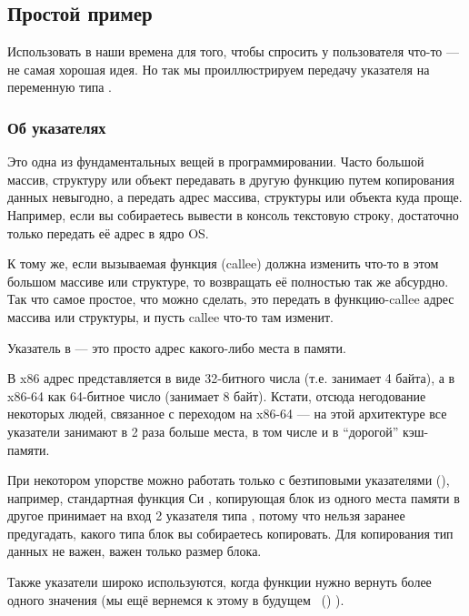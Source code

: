 \subsection{Простой пример}



Использовать \scanf в наши времена для того, чтобы спросить у пользователя что-то --- не самая хорошая идея.
Но так мы проиллюстрируем передачу указателя на переменную типа \Tint.

\subsubsection{Об указателях}
\myindex{\CLanguageElements!\Pointers}

Это одна из фундаментальных вещей в программировании.
Часто большой массив, структуру или объект передавать в другую функцию путем копирования данных невыгодно, а передать адрес массива, структуры или объекта куда проще.
Например, если вы собираетесь вывести в консоль текстовую строку, достаточно только передать её адрес в ядро \ac{OS}.

К тому же, если вызываемая функция (\gls{callee}) должна изменить что-то в этом большом массиве или структуре, то возвращать её полностью так же абсурдно.
Так что самое простое, что можно сделать, это передать в функцию-\gls{callee} адрес массива или структуры, и пусть \gls{callee} что-то там изменит.

Указатель в \CCpp --- это просто адрес какого-либо места в памяти.

В x86 адрес представляется в виде 32-битного числа (т.е. занимает 4 байта), а в x86-64 как 64-битное число (занимает 8 байт).
Кстати, отсюда негодование некоторых людей, связанное с переходом на x86-64 --- на этой архитектуре все указатели занимают в 2 раза больше места, в том числе и в ``дорогой'' кэш-памяти.

При некотором упорстве можно работать только с безтиповыми указателями (), например, стандартная функция Си ,
копирующая блок из одного места памяти в другое принимает на вход 2 указателя типа , потому что нельзя заранее предугадать, какого типа блок вы собираетесь копировать.
Для копирования тип данных не важен, важен только размер блока.

Также указатели широко используются, когда функции нужно вернуть более одного значения
(мы ещё вернемся к этому в будущем
~()
).

